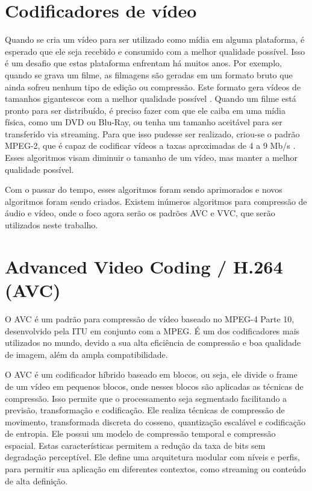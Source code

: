 \section{Codificadores de vídeo}%

Quando se cria um vídeo para ser utilizado como mídia em alguma plataforma, é esperado
que ele seja recebido e consumido com a melhor qualidade possível. Isso é um desafio
que estas plataforma enfrentam há muitos anos. Por exemplo, quando se grava um filme,
as filmagens são geradas em um formato bruto que ainda sofreu nenhum tipo de edição
ou compressão. Este formato gera vídeos de tamanhos gigantescos com a melhor qualidade
possível \cite{what_is_raw_footage}. Quando um filme está pronto para ser distribuído,
é preciso fazer com que ele caiba em uma mídia física, como um DVD ou Blu-Ray, ou tenha
um tamanho aceitável para ser transferido via streaming. Para que isso pudesse ser
realizado, criou-se o padrão MPEG-2, que é capaz de codificar vídeos a taxas aproximadas
de 4 a 9 Mb/s \cite{mpeg2}. Esses algoritmos visam diminuir o tamanho de um vídeo,
mas manter a melhor qualidade possível.

Com o passar do tempo, esses algoritmos foram sendo aprimorados e novos algoritmos
foram sendo criados. Existem inúmeros algoritmos para compressão de áudio e vídeo,
onde o foco agora serão os padrões \acrfull{AVC} e \acrfull{VVC}, que serão utilizados
neste trabalho.

\section{Advanced Video Coding / H.264 (AVC)}

O \acrshort{AVC} é um padrão para compressão de vídeo baseado no MPEG-4 Parte 10,
desenvolvido pela \acrfull{ITU} em conjunto com a \acrshort{MPEG}. É um dos
codificadores mais utilizados no mundo, devido a sua alta eficiência de compressão
e boa qualidade de imagem, além da ampla compatibilidade.

O \acrshort{AVC} é um codificador híbrido baseado em blocos, ou seja, ele divide
o frame de um vídeo em pequenos blocos, onde nesses blocos são aplicadas as técnicas de
compressão. Isso permite que o processamento seja segmentado facilitando a previsão,
transformação e codificação. Ele realiza técnicas de compressão de movimento, transformada discreta do 
cosseno, quantização escalável e codificação de entropia. Ele possui um modelo de 
compressão temporal e compressão espacial. Estas características permitem a redução 
da taxa de bits sem degradação perceptível. Ele define uma arquitetura modular com 
níveis e perfis, para permitir sua aplicação em diferentes contextos, como streaming 
ou conteúdo de alta definição.

